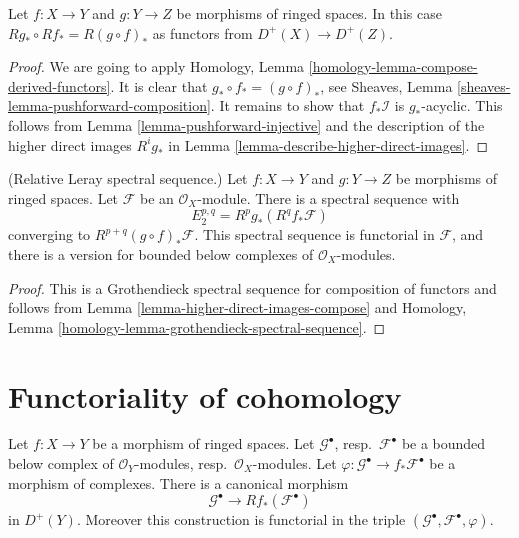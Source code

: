 \begin{lemma}
\label{lemma-higher-direct-images-compose}
Let $f : X \to Y$ and $g : Y \to Z$ be morphisms of ringed spaces.
In this case $Rg_* \circ Rf_* = R(g \circ f)_*$ as functors
from $D^{+}(X) \to D^{+}(Z)$.
\end{lemma}

\begin{proof}
We are going to apply
Homology, Lemma \ref{homology-lemma-compose-derived-functors}.
It is clear that $g_* \circ f_* = (g \circ f)_*$, see
Sheaves, Lemma \ref{sheaves-lemma-pushforward-composition}.
It remains to show that $f_*\mathcal{I}$ is $g_*$-acyclic.
This follows from Lemma \ref{lemma-pushforward-injective}
and the description of the
higher direct images $R^ig_*$ in
Lemma \ref{lemma-describe-higher-direct-images}.
\end{proof}

\begin{lemma}
\label{lemma-relative-Leray}
(Relative Leray spectral sequence.)
Let $f : X \to Y$ and $g : Y \to Z$ be morphisms of ringed spaces.
Let $\mathcal{F}$ be an $\mathcal{O}_X$-module.
There is a spectral sequence with
$$
E_2^{p, q} = R^pg_*(R^qf_*\mathcal{F})
$$
converging to $R^{p + q}(g \circ f)_*\mathcal{F}$.
This spectral sequence is functorial in $\mathcal{F}$, and there
is a version for bounded below complexes of $\mathcal{O}_X$-modules.
\end{lemma}

\begin{proof}
This is a Grothendieck spectral sequence for composition of functors
and follows from Lemma \ref{lemma-higher-direct-images-compose} and
Homology, Lemma \ref{homology-lemma-grothendieck-spectral-sequence}.
\end{proof}














\section{Functoriality of cohomology}
\label{section-functoriality}

\begin{lemma}
\label{lemma-functoriality}
Let $f : X \to Y$ be a morphism of ringed spaces.
Let $\mathcal{G}^\bullet$, resp.\ $\mathcal{F}^\bullet$ be
a bounded below complex of $\mathcal{O}_Y$-modules,
resp.\ $\mathcal{O}_X$-modules. Let
$\varphi : \mathcal{G}^\bullet \to f_*\mathcal{F}^\bullet$
be a morphism of complexes. There is a canonical morphism
$$
\mathcal{G}^\bullet
\longrightarrow
Rf_*(\mathcal{F}^\bullet)
$$
in $D^{+}(Y)$. Moreover this construction is functorial in the triple
$(\mathcal{G}^\bullet, \mathcal{F}^\bullet, \varphi)$.
\end{lemma}

